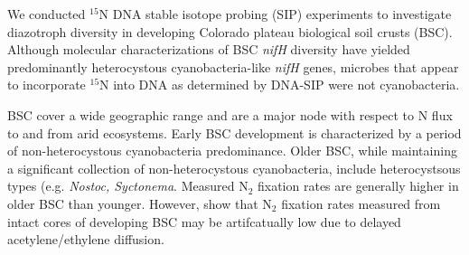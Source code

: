 We conducted $^{15}$N DNA stable isotope probing (SIP) experiments to investigate diazotroph diversity in developing Colorado plateau biological soil crusts (BSC). Although molecular characterizations of BSC \textit{nifH} diversity have yielded predominantly heterocystous cyanobacteria-like \textit{nifH} genes, microbes that appear to incorporate $^{15}$N into DNA as determined by DNA-SIP were not cyanobacteria.

BSC cover a wide geographic range and are a major node with respect to N flux to and from arid ecosystems. Early BSC development is characterized by a period of non-heterocystous cyanobacteria predominance. Older BSC, while maintaining a significant collection of non-heterocystous cyanobacteria, include heterocystsous types (e.g. \textit{Nostoc, Syctonema}. Measured N$_{2}$ fixation rates are generally higher in older BSC than younger. However, \citet{15643930} show that N$_{2}$ fixation rates measured from intact cores of developing BSC may be artifcatually low due to delayed acetylene/ethylene diffusion. 


